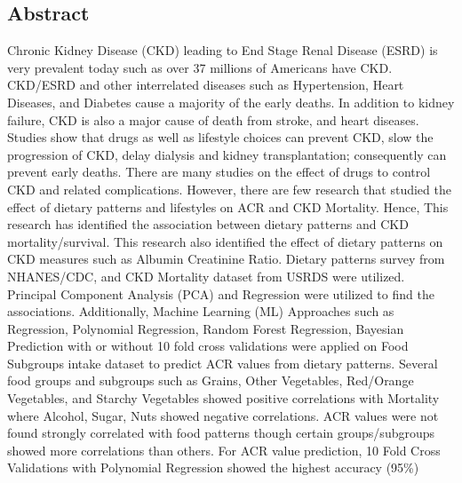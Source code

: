 \thispagestyle{plain}
\begin{center} \section*{Abstract} \end{center}
Chronic Kidney Disease (CKD) leading to End Stage Renal Disease (ESRD) is very prevalent today such as over 37 millions of Americans have CKD. CKD/ESRD and other interrelated diseases such as Hypertension, Heart Diseases, and Diabetes cause a majority of the early deaths. In addition to kidney failure, CKD is also a major cause of death from stroke, and heart diseases. Studies show that drugs as well as lifestyle choices can prevent CKD, slow the progression of CKD, delay dialysis and kidney transplantation; consequently can prevent early deaths. There are many studies on the effect of drugs to control CKD and related complications. However, there are few research that studied the effect of  dietary patterns and lifestyles on ACR and CKD Mortality. Hence, This research has identified the association between dietary patterns and CKD mortality/survival. This research also identified the effect of dietary patterns on CKD measures such as Albumin Creatinine Ratio. Dietary patterns survey from NHANES/CDC, and CKD Mortality dataset from USRDS were utilized. Principal Component Analysis (PCA) and Regression were utilized to find the associations. Additionally, Machine Learning (ML) Approaches such as Regression, Polynomial Regression, Random Forest Regression, Bayesian Prediction with or without 10 fold cross validations were applied on Food Subgroups intake dataset to predict ACR values from dietary patterns. Several food groups and subgroups such as Grains, Other Vegetables, Red/Orange Vegetables, and Starchy Vegetables showed positive correlations with Mortality where Alcohol, Sugar, Nuts showed negative correlations. ACR values were not found strongly correlated with food patterns though certain groups/subgroups showed more correlations than others. For ACR value prediction, 10 Fold Cross Validations with Polynomial Regression showed the highest accuracy (95\%)
